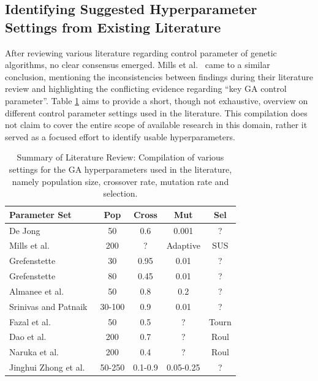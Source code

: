 \subsection{Identifying Suggested Hyperparameter Settings from Existing Literature}
After reviewing various literature regarding control parameter of genetic algorithms, no clear consensus emerged. Mills et al.~\cite{mills_determining_2015} came to a similar conclusion, mentioning the inconsistencies between findings during their literature review and highlighting the conflicting evidence regarding \enquote{key GA control parameter}. Table \ref{tab:hyperparameter_tuning:ga_hyperparameters} aims to provide a short, though not exhaustive, overview on different control parameter settings used in the literature. This compilation does not claim to cover the entire scope of available research in this domain, rather it served as a focused effort to identify usable hyperparameters.

\begin{table}[ht]
	\centering
	\begin{tabular}{lcccc}
		\hline
		\textbf{Parameter Set} & \textbf{Pop} & \textbf{Cross} & \textbf{Mut} & \textbf{Sel} \\
		\hline
		De Jong~\cite{de_jong_analysis_1975} & 50 & 0.6 & 0.001 & ? \\
		Mills et al.~\cite{mills_determining_2015} & 200 & ? & Adaptive & SUS\\
		Grefenstette~\cite{grefenstette_optimization_1986} & 30 & 0.95 & 0.01 & ?\\
		Grefenstette~\cite{grefenstette_optimization_1986} & 80 & 0.45 & 0.01 & ?\\
		Almanee et al.~\cite{almanee_scenorita_2021} & 50 & 0.8 & 0.2 & ?\\
		Srinivas and Patnaik~\cite{srinivas_genetic_1994}  & 30-100 & 0.9 & 0.01 & ?\\
		Fazal et al.~\cite{fazal_estimating_2005} & 50 & 0.5 & ? & Tourn\\
		Dao et al.~\cite{dao_maximising_2016} & 200 & 0.7 & ? & Roul\\
		Naruka et al.~\cite{naruka_parameter_2019} & 200 & 0.4 & ? & Roul \\
		Jinghui Zhong et al.~\cite{jinghui_zhong_comparison_2005} & 50-250 & 0.1-0.9 & 0.05-0.25 & ?\\
		\hline
	\end{tabular}
	\caption{Summary of Literature Review: Compilation of various settings for the GA hyperparameters used in the literature, namely population size, crossover rate, mutation rate and selection.}
	\label{tab:hyperparameter_tuning:ga_hyperparameters}
\end{table}

